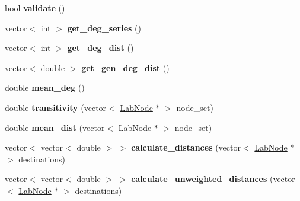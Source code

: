 \begin{DoxyCompactItemize}
\item 
\hypertarget{classelps_1_1_lab_network_aaa17daca60c737db1f1035f058ecce38}{bool {\bfseries validate} ()}\label{classelps_1_1_lab_network_aaa17daca60c737db1f1035f058ecce38}

\item 
\hypertarget{classelps_1_1_lab_network_a902bedf2660f1abe82f52eb945f61417}{vector$<$ int $>$ {\bfseries get\+\_\+deg\+\_\+series} ()}\label{classelps_1_1_lab_network_a902bedf2660f1abe82f52eb945f61417}

\item 
\hypertarget{classelps_1_1_lab_network_a040ead6f3849f210eda46f67a299b12b}{vector$<$ int $>$ {\bfseries get\+\_\+deg\+\_\+dist} ()}\label{classelps_1_1_lab_network_a040ead6f3849f210eda46f67a299b12b}

\item 
\hypertarget{classelps_1_1_lab_network_a993fee842b6ae21cec8bcf9b0579677b}{vector$<$ double $>$ {\bfseries get\+\_\+gen\+\_\+deg\+\_\+dist} ()}\label{classelps_1_1_lab_network_a993fee842b6ae21cec8bcf9b0579677b}

\item 
\hypertarget{classelps_1_1_lab_network_a881f92e6cd40429915f9980bfbe0b2a4}{double {\bfseries mean\+\_\+deg} ()}\label{classelps_1_1_lab_network_a881f92e6cd40429915f9980bfbe0b2a4}

\item 
\hypertarget{classelps_1_1_lab_network_ae21592036aec8bc96cd424e93a45d4bd}{double {\bfseries transitivity} (vector$<$ \hyperlink{classelps_1_1_lab_node}{Lab\+Node} $\ast$ $>$ node\+\_\+set)}\label{classelps_1_1_lab_network_ae21592036aec8bc96cd424e93a45d4bd}

\item 
\hypertarget{classelps_1_1_lab_network_aa0e33c933e5091abba1b27817876487a}{double {\bfseries mean\+\_\+dist} (vector$<$ \hyperlink{classelps_1_1_lab_node}{Lab\+Node} $\ast$ $>$ node\+\_\+set)}\label{classelps_1_1_lab_network_aa0e33c933e5091abba1b27817876487a}

\item 
\hypertarget{classelps_1_1_lab_network_a046a283aee68ce0d20087a706794a5c6}{vector$<$ vector$<$ double $>$ $>$ {\bfseries calculate\+\_\+distances} (vector$<$ \hyperlink{classelps_1_1_lab_node}{Lab\+Node} $\ast$ $>$ destinations)}\label{classelps_1_1_lab_network_a046a283aee68ce0d20087a706794a5c6}

\item 
\hypertarget{classelps_1_1_lab_network_aa9abbf4211e6dd789da2f84107dbb9f8}{vector$<$ vector$<$ double $>$ $>$ {\bfseries calculate\+\_\+unweighted\+\_\+distances} (vector$<$ \hyperlink{classelps_1_1_lab_node}{Lab\+Node} $\ast$ $>$ destinations)}\label{classelps_1_1_lab_network_aa9abbf4211e6dd789da2f84107dbb9f8}


\end{DoxyCompactItemize}

